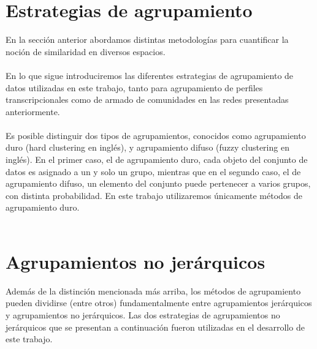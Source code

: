 \section{Estrategias de agrupamiento}
En la sección anterior abordamos distintas metodologías para cuantificar la noción de similaridad en diversos espacios.\\\\
En lo que sigue introduciremos las diferentes estrategias de agrupamiento de datos utilizadas en este trabajo, tanto para agrupamiento de perfiles transcripcionales como de armado de comunidades en las redes presentadas anteriormente.\\\\
Es posible distinguir dos tipos de agrupamientos, conocidos como agrupamiento duro (hard clustering en inglés), y agrupamiento difuso (fuzzy clustering en inglés). En el primer caso, el de agrupamiento duro, cada objeto del conjunto de datos es asignado a un y solo un grupo, mientras que en el segundo caso, el de agrupamiento difuso, un elemento del conjunto puede pertenecer a varios grupos, con distinta probabilidad. En este trabajo utilizaremos únicamente métodos de agrupamiento duro.\\\\
\section{Agrupamientos no jerárquicos}
\label{sec:agrupamientos_no_jerarquicos}
Además de la distinción mencionada más arriba, los métodos de agrupamiento pueden dividirse (entre otros) fundamentalmente entre agrupamientos jerárquicos y agrupamientos no jerárquicos.
Las dos estrategias de agrupamientos no jerárquicos que se presentan a continuación fueron utilizadas en el desarrollo de este trabajo.
